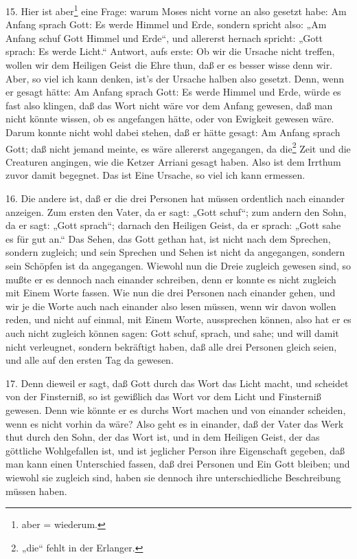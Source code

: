 15. Hier ist aber\footnote{aber = wiederum.} eine Frage: warum Moses nicht vorne an also gesetzt habe: Am Anfang sprach Gott: Es werde Himmel und Erde, sondern spricht also: „Am Anfang schuf Gott Himmel und Erde“, und allererst hernach spricht: „Gott sprach: Es werde Licht.“ Antwort, aufs erste: Ob wir die Ursache nicht treffen, wollen wir dem Heiligen Geist die Ehre thun, daß er es besser wisse denn wir. Aber, so viel ich kann denken, ist's der Ursache halben also gesetzt. Denn, wenn er gesagt hätte: Am Anfang sprach Gott: Es werde Himmel und Erde, würde es fast also klingen, daß das Wort nicht wäre vor dem Anfang gewesen, daß man nicht könnte wissen, ob es angefangen hätte, oder von Ewigkeit gewesen wäre. Darum konnte nicht wohl dabei stehen, daß er hätte gesagt: Am Anfang sprach Gott; daß nicht jemand meinte, es wäre allererst angegangen, da die\footnote{„die“ fehlt in der Erlanger.} Zeit und die Creaturen angingen, wie die Ketzer Arriani gesagt haben. Also ist dem Irrthum zuvor damit begegnet. Das ist Eine Ursache, so viel ich kann ermessen.

16. Die andere ist, daß er die drei Personen hat müssen ordentlich nach einander anzeigen. Zum ersten den Vater, da er sagt: „Gott schuf“; zum andern den Sohn, da er sagt: „Gott sprach“; darnach den Heiligen Geist, da er sprach: „Gott sahe es für gut an.“ Das Sehen, das Gott gethan hat, ist nicht nach dem Sprechen, sondern zugleich; und sein Sprechen und Sehen ist nicht da angegangen, sondern sein Schöpfen ist da angegangen. Wiewohl nun die Dreie zugleich gewesen sind, so mußte er es dennoch nach einander schreiben, denn er konnte es nicht zugleich mit Einem Worte fassen. Wie nun die drei Personen nach einander gehen, und wir je die Worte auch nach einander also lesen müssen, wenn wir davon wollen reden, und nicht auf einmal, mit Einem Worte, aussprechen können, also hat er es auch nicht zugleich können sagen: Gott schuf, sprach, und sahe; und will damit nicht verleugnet, sondern bekräftigt haben, daß alle drei Personen gleich seien, und alle auf den ersten Tag da gewesen.

17. Denn dieweil er sagt, daß Gott durch das Wort das Licht macht, und scheidet von der Finsterniß, so ist gewißlich das Wort vor dem Licht und Finsterniß gewesen. Denn wie könnte er es durchs Wort machen und von einander scheiden, wenn es nicht vorhin da wäre? Also geht es in einander, daß der Vater das Werk thut durch den Sohn, der das Wort ist, und in dem Heiligen Geist, der das göttliche Wohlgefallen ist, und ist jeglicher Person ihre Eigenschaft gegeben, daß man kann einen Unterschied fassen, daß drei Personen und Ein Gott bleiben; und wiewohl sie zugleich sind, haben sie dennoch ihre unterschiedliche Beschreibung müssen haben.

